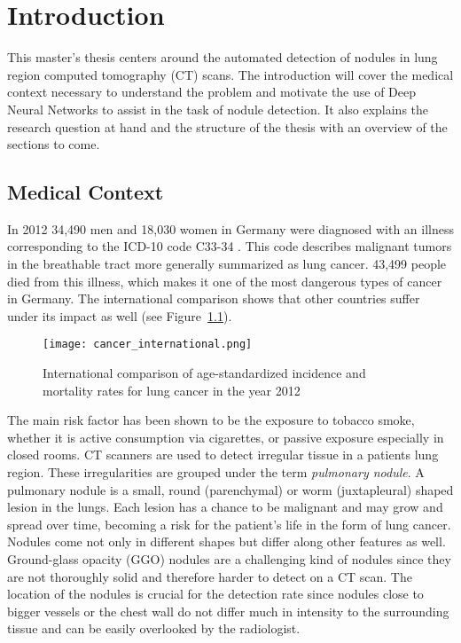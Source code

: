 \documentclass[main.tex]{subfiles}
\begin{document}
\chapter{Introduction}
This master's thesis centers around the automated detection of nodules in lung region computed tomography (CT) scans. The introduction will cover the medical context necessary to understand the problem and motivate the use of Deep Neural Networks to assist in the task of nodule detection. It also explains the research question at hand and the structure of the thesis with an overview of the sections to come.

\section{Medical Context}
In 2012 34,490 men and 18,030 women in Germany were diagnosed with an illness corresponding to the ICD-10 code C33-34 \cite{koch2015krebs}. This code describes malignant tumors in the breathable tract more generally summarized as lung cancer. 43,499 people died from this illness, which makes it one of the most dangerous types of cancer in Germany. The international comparison shows that other countries suffer under its impact as well (see Figure~\ref{fig:cancInt}).

\begin{figure}[ht]
\texttt{[image: cancer\_international.png]}
\caption{International comparison of age-standardized incidence and mortality rates for lung cancer in the year 2012}
\label{fig:cancInt}
\end{figure}

The main risk factor has been shown to be the exposure to tobacco smoke, whether it is active consumption via cigarettes, or passive exposure especially in closed rooms. CT scanners are used to detect irregular tissue in a patients lung region. These irregularities are grouped under the term \textit{pulmonary nodule}. A pulmonary nodule is a small, round (parenchymal) or worm (juxtapleural) shaped lesion in the lungs. Each lesion has a chance to be malignant and may grow and spread over time, becoming a risk for the patient's life in the form of lung cancer. Nodules come not only in different shapes but differ along other features as well. Ground-glass opacity (GGO) nodules are a challenging kind of nodules since they are not thoroughly solid and therefore harder to detect on a CT scan. The location of the nodules is crucial for the detection rate since nodules close to bigger vessels or the chest wall do not differ much in intensity to the surrounding tissue and can be easily overlooked by the radiologist.
\end{document}
